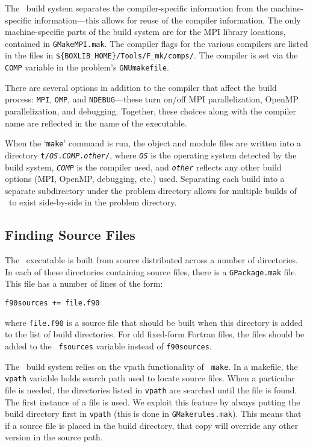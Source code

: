 The \boxlib\ build system separates the compiler-specific information
from the machine-specific information---this allows for reuse of the
compiler information.  The only machine-specific parts of the build system
are for the MPI library locations, contained in {\tt GMakeMPI.mak}.
The compiler flags for the various compilers are listed in the
files in {\tt \$\{BOXLIB\_HOME\}/Tools/F\_mk/comps/}.  The compiler
is set via the {\tt COMP} variable in the problem's {\tt GNUmakefile}.

There are several options in addition to the compiler that affect the
build process: {\tt MPI}, {\tt OMP}, and {\tt NDEBUG}---these turn on/off
MPI parallelization, OpenMP parallelization, and debugging.  Together,
these choices along with the compiler name are reflected in the name
of the executable.  

When the `{\tt make}' command is run, the object and module files are
written into a directory {\tt t/{\em OS}.{\em COMP}.{\em other}/},
where {\tt \em OS} is the operating system detected by the build
system, {\tt \em COMP} is the compiler used, and {\tt \em other}
reflects any other build options (MPI, OpenMP, debugging, etc.) used.
Separating each build into a separate subdirectory under the problem
directory allows for multiple builds of \maestro\ to exist
side-by-side in the problem directory.

\subsection{Finding Source Files}

The \maestro\ executable is built from source distributed across a
number of directories.  In each of these directories containing source
files, there is a {\tt GPackage.mak} file.  This file has a number of
lines of the form:
\begin{verbatim}
f90sources += file.f90
\end{verbatim}
where {\tt file.f90} is a source file that should be built when this
directory is added to the list of build directories.  For old
fixed-form Fortran files, the files should be added to the {\tt
fsources} variable instead of {\tt f90sources}.

The \boxlib\ build system relies on the vpath functionality of {\tt
make}.  In a makefile, the {\tt vpath} variable holds search path used
to locate source files.  When a particular file is needed, the
directories listed in {\tt vpath} are searched until the file is
found.  The first instance of a file is used.  We exploit this feature
by always putting the build directory first in {\tt vpath} (this is
done in {\tt GMakerules.mak}).  This means that if a source file is
placed in the build directory, that copy will override any other
version in the source path.

